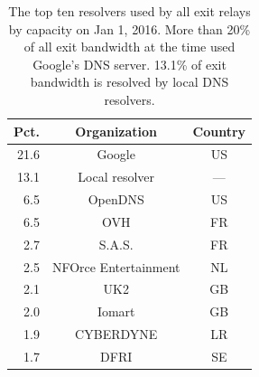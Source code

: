\begin{table}[t]
	\centering
	\begin{tabular}{rcc}
	\textbf{Pct.} & \textbf{Organization} & \textbf{Country} \\
	\hline
21.6 & Google & US \\ %
13.1 & Local resolver & --- \\ %
6.5 & OpenDNS & US \\ %
6.5 & OVH & FR \\ %
2.7 & S.A.S. & FR \\ %
2.5 & NFOrce Entertainment & NL \\ %
2.1 & UK2 & GB \\ %
2.0 & Iomart & GB \\ %
1.9 & CYBERDYNE & LR \\ %
1.7 & DFRI & SE \\ %

	\end{tabular}
	\caption{The top ten resolvers used by all exit relays by capacity on Jan 1,
	2016.  More than 20\% of all exit bandwidth at the time used Google's DNS
	server.  13.1\% of exit bandwidth is resolved by local DNS resolvers.}
	\label{tab:dns-resolvers}
\end{table}

